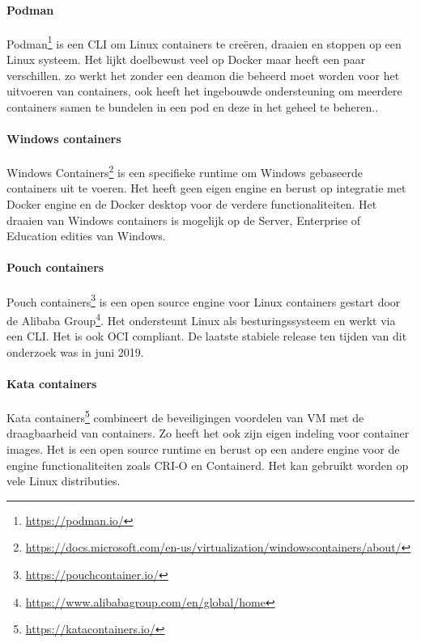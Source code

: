 \paragraph{Podman}
Podman\footnote{\url{https://podman.io/}} is een CLI om Linux containers te creëren, draaien en stoppen op een Linux systeem. Het lijkt doelbewust veel op Docker maar heeft een paar verschillen. zo werkt het zonder een deamon die beheerd moet worden voor het uitvoeren van containers, ook heeft het ingebouwde ondersteuning om meerdere  containers samen te bundelen in een pod en deze in het geheel te beheren..
\paragraph{Windows containers}
Windows Containers\footnote{\url{https://docs.microsoft.com/en-us/virtualization/windowscontainers/about/}} is een specifieke runtime om Windows gebaseerde containers uit te voeren. Het heeft geen eigen engine en berust op integratie met Docker engine en de Docker desktop voor de verdere functionaliteiten. Het draaien van Windows containers is mogelijk op de Server, Enterprise of Education edities van Windows.
\paragraph{Pouch containers}
Pouch containers\footnote{\url{https://pouchcontainer.io/}} is een open source engine voor Linux containers gestart door de Alibaba Group\footnote{\url{https://www.alibabagroup.com/en/global/home}}. Het ondersteunt Linux als besturingssysteem en werkt via een CLI. Het is ook OCI compliant. De laatste stabiele release ten tijden van dit onderzoek was in juni 2019.
\paragraph{Kata containers}
Kata containers\footnote{\url{https://katacontainers.io/}} combineert de beveiligingen voordelen van VM met de draagbaarheid van containers. Zo heeft het ook zijn eigen indeling voor container images.  Het is een open source runtime en berust op een andere engine voor de engine functionaliteiten zoals CRI-O en Containerd. Het kan gebruikt worden op vele Linux distributies.
